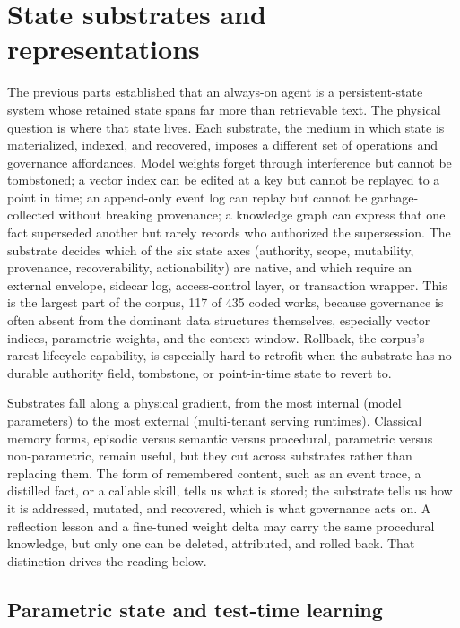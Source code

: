\section{State substrates and representations}\label{sec:substrates}


The previous parts established that an always-on agent is a persistent-state system whose retained state spans far more than retrievable text. The physical question is where that state lives. Each substrate, the medium in which state is materialized, indexed, and recovered, imposes a different set of operations and governance affordances. Model weights forget through interference but cannot be tombstoned; a vector index can be edited at a key but cannot be replayed to a point in time; an append-only event log can replay but cannot be garbage-collected without breaking provenance; a knowledge graph can express that one fact superseded another but rarely records who authorized the supersession. The substrate decides which of the six state axes (authority, scope, mutability, provenance, recoverability, actionability) are native, and which require an external envelope, sidecar log, access-control layer, or transaction wrapper. This is the largest part of the corpus, 117 of 435 coded works, because governance is often absent from the dominant data structures themselves, especially vector indices, parametric weights, and the context window. Rollback, the corpus's rarest lifecycle capability, is especially hard to retrofit when the substrate has no durable authority field, tombstone, or point-in-time state to revert to.

Substrates fall along a physical gradient, from the most internal (model parameters) to the most external (multi-tenant serving runtimes). Classical memory forms, episodic versus semantic versus procedural, parametric versus non-parametric, remain useful, but they cut across substrates rather than replacing them. The form of remembered content, such as an event trace, a distilled fact, or a callable skill, tells us what is stored; the substrate tells us how it is addressed, mutated, and recovered, which is what governance acts on. A reflection lesson and a fine-tuned weight delta may carry the same procedural knowledge, but only one can be deleted, attributed, and rolled back. That distinction drives the reading below.

\subsection{Parametric state and test-time learning}

